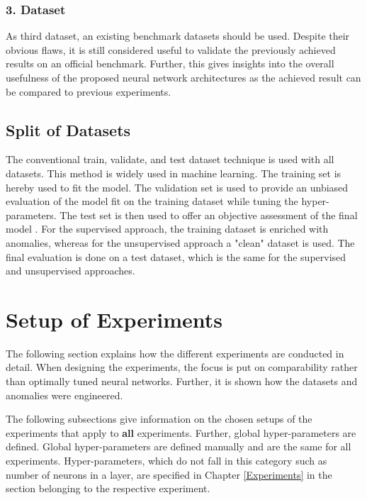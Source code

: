\subsubsection{3. Dataset}
As third dataset, an existing benchmark datasets should be used. Despite their obvious flaws, it is still considered useful to validate the previously achieved results on an official benchmark. Further, this gives insights into the overall usefulness of the proposed neural network architectures as the achieved result can be compared to previous experiments.

\subsection{Split of Datasets}
The conventional train, validate, and test dataset technique is used with all datasets.
This method is widely used in machine learning. The training set is hereby used to fit the model. The validation set is used to provide an unbiased evaluation of the model fit on the training dataset while tuning the hyper-parameters. The test set is then used to offer an objective assessment of the final model \parencite{Brownlee2017}. For the supervised approach, the training dataset is enriched with anomalies, whereas for the unsupervised approach a "clean" dataset is used. The final evaluation is done on a test dataset, which is the same for the supervised and unsupervised approaches.


\section{Setup of Experiments} \label{SetupOfExperiments}
The following section explains how the different experiments are conducted in detail. When designing the experiments, the focus is put on comparability rather than optimally tuned neural networks.  Further, it is shown how the datasets and anomalies were engineered.

The following subsections give information on the chosen setups of the experiments that apply to \textbf{all} experiments. Further, global hyper-parameters are defined. Global hyper-parameters are defined manually and are the same for all experiments. Hyper-parameters, which do not fall in this category such as number of neurons in a layer, are specified in Chapter \ref{Experiments} in the section belonging to the respective experiment.

